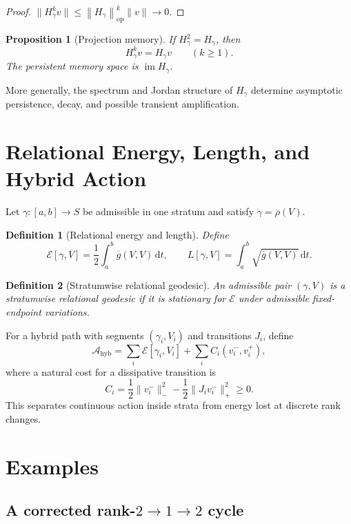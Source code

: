 \documentclass[11pt]{article}
\newtheorem{definition}{Definition}[section]
\newtheorem{proposition}{Proposition}[section]
\newcommand{\im}{\operatorname{im}}
\newcommand{\dd}{\,\mathrm{d}}
\newcommand{\opnorm}[1]{\left\lVert #1\right\rVert_{\mathrm{op}}}
\begin{document}
\begin{proof}
$\|H_\gamma^k v\|\le\opnorm{H_\gamma}^k\|v\|\to0$.
\end{proof}

\begin{proposition}[Projection memory]
If $H_\gamma^2=H_\gamma$, then
\[
H_\gamma^k v=H_\gamma v
\qquad(k\ge1).
\]
The persistent memory space is $\im H_\gamma$.
\end{proposition}

More generally, the spectrum and Jordan structure of $H_\gamma$ determine
asymptotic persistence, decay, and possible transient amplification.

\section{Relational Energy, Length, and Hybrid Action}
\label{sec:geodesics}

Let $\gamma:[a,b]\to S$ be admissible in one stratum and satisfy
$\dot\gamma=\overline\rho(V)$.

\begin{definition}[Relational energy and length]
Define
\[
\mathcal E[\gamma,V]
=\frac12\int_a^b\overline g(V,V)\dd t,
\qquad
L[\gamma,V]
=\int_a^b\sqrt{\overline g(V,V)}\dd t.
\]
\end{definition}

\begin{definition}[Stratumwise relational geodesic]
An admissible pair $(\gamma,V)$ is a stratumwise relational geodesic if it is
stationary for $\mathcal E$ under admissible fixed-endpoint variations.
\end{definition}

For a hybrid path with segments $(\gamma_i,V_i)$ and transitions $J_i$, define
\[
\mathcal A_{\mathrm{hyb}}
=\sum_i\mathcal E[\gamma_i,V_i]
+\sum_i C_i(v_i^-,v_i^+),
\]
where a natural cost for a dissipative transition is
\[
C_i
=\frac12\|v_i^-\|_-^2-
\frac12\|J_iv_i^-\|_+^2\ge0.
\]
This separates continuous action inside strata from energy lost at discrete
rank changes.

\section{Examples}
\label{sec:examples}

\subsection{A corrected rank-$2\to1\to2$ cycle}
\end{document}
